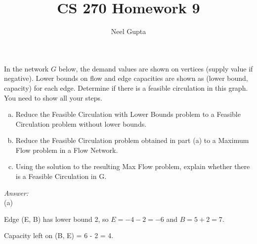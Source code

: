 \documentclass[12pt]{article}
\newenvironment{problem}[2][Problem]{\begin{trivlist}
\item[\hskip \labelsep {\bfseries #1}\hskip \labelsep {\bfseries #2.}]}{\end{trivlist}}
\begin{document}

\title{\vspace{-4cm}CS 270 Homework 9}
\author{Neel Gupta} 
\maketitle

\begin{problem}{1}
    In the network $G$ below, the demand values are shown on vertices (supply value if negative). Lower bounds on flow and edge capacities are shown as (lower bound, capacity) for each edge. Determine if there is a feasible circulation in this graph. You need to show all your steps.

    \begin{enumerate}[(a)]
        \item Reduce the Feasible Circulation with Lower Bounds problem to a Feasible Circulation problem without lower bounds.
        \item Reduce the Feasible Circulation problem obtained in part (a) to a Maximum Flow problem in a Flow Network.
        \item Using the solution to the resulting Max Flow problem, explain whether there is a Feasible Circulation in G.
    \end{enumerate}
\end{problem}

\textit{Answer:}\\(a)

Edge (E, B) has lower bound 2, so $E = -4 - 2 =-6$ and $B = 5 + 2 = 7$. 

Capacity left on (B, E) = 6 - 2 = 4.
\end{document}
